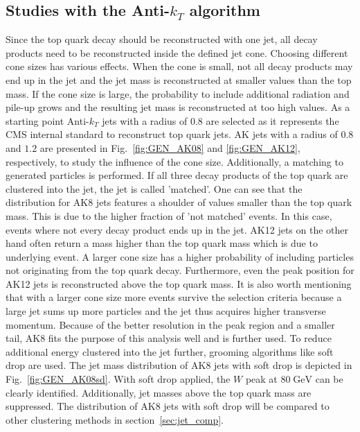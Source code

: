 \FloatBarrier %
\subsection{Studies with the Anti-$k_T$ algorithm}
\label{sec:AK}	
	Since the top quark decay should be reconstructed with one jet, all decay products need to be reconstructed inside the defined jet cone. Choosing different cone sizes has various effects. When the cone is small, not all decay products may end up in the jet and the jet mass is reconstructed at smaller values than the top mass. If the cone size is large, the probability to include additional radiation and pile-up grows and the resulting jet mass is reconstructed at too high values. As a starting point Anti-$k_T$ jets with a radius of $0.8$ are selected as it represents the CMS internal standard to reconstruct top quark jets. AK jets with a radius of $0.8$ and $1.2$ are presented in Fig.~\ref{fig:GEN_AK08} and \ref{fig:GEN_AK12}, respectively, to study the influence of the cone size. Additionally, a matching to generated particles is performed. If all three decay products of the top quark are clustered into the jet, the jet is called 'matched'. One can see that the distribution for AK8 jets features a shoulder of values smaller than the top quark mass. This is due to the higher fraction of 'not matched' events. In this case, events where not every decay product ends up in the jet. AK12 jets on the other hand often return a mass higher than the top quark mass which is due to underlying event. A larger cone size has a higher probability of including particles not originating from the top quark decay. Furthermore, even the peak position for AK12 jets is reconstructed above the top quark mass. It is also worth mentioning that with a larger cone size more events survive the selection criteria because a large jet sums up more particles and the jet thus acquires higher transverse momentum. Because of the better resolution in the peak region and a smaller tail, AK8 fits the purpose of this analysis well and is further used. To reduce additional energy clustered into the jet further, grooming algorithms like soft drop are used. The jet mass distribution of AK8 jets with soft drop is depicted in Fig.~\ref{fig:GEN_AK08sd}. With soft drop applied, the $W$ peak at $80\;\text{GeV}$ can be clearly identified. Additionally, jet masses above the top quark mass are suppressed. The distribution of AK8 jets with soft drop will be compared to other clustering methods in section~\ref{sec:jet_comp}.

